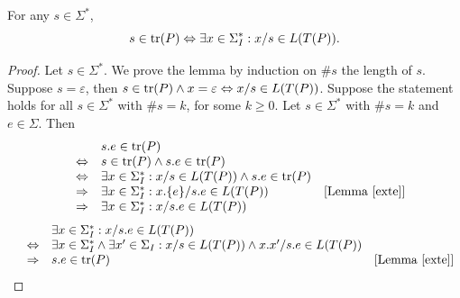 \begin{lemma}\label{cont}
For any $s\in \Sigma^*$,
$$s\in \text{tr}(P) \Leftrightarrow \exists x\in \Sigma_I^*: x/s \in L(T(P)).$$
\end{lemma}
%
\begin{proof}
Let $s\in \Sigma^*$. We prove the lemma by induction on $\#s$ the length of $s$. Suppose $s=\varepsilon $, then $s\in \text{tr}(P)\wedge x=\varepsilon \Leftrightarrow x/s\in L(T(P))$. Suppose the statement holds for all $s\in \Sigma^*$ with $\#s=k$, for some $k\ge 0$. Let $s\in \Sigma^*$ with $\#s=k$ and $e\in\Sigma$.
Then \[\begin{array}{llll}
&& s.e\in \text{tr}(P)\\
&\Leftrightarrow & s\in \text{tr}(P)\wedge s.e\in \text{tr}(P)\\
&\Leftrightarrow &  \exists x\in \Sigma_I^*: x/s\in L(T(P))\wedge s.e\in \text{tr}(P)\\
&\Rightarrow & \exists x\in \Sigma_I^*: x.\{e\}/s.e\in L(T(P))&[{\text{Lemma~\ref{exte}}}]\\
&\Rightarrow & \exists x\in \Sigma_I^*: x/s.e\in L(T(P))
\end{array}
\]
 \[\begin{array}{llll}
&& \exists x\in \Sigma_I^*: x/s.e\in L(T(P))\\
&\Leftrightarrow & \exists x\in \Sigma_I^*\wedge \exists x'\in \Sigma_I: x/s\in L(T(P))\wedge x.x'/s.e\in L(T(P))\\
&\Rightarrow & s.e\in \text{tr}(P)&[{\text{Lemma~\ref{exte}}}]\\
\end{array}
\]
\end{proof}

